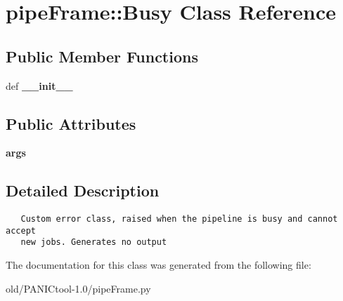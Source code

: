\section{pipe\-Frame::Busy Class Reference}
\label{classpipeFrame_1_1Busy}
\subsection*{Public Member Functions}
\begin{CompactItemize}
\item 
def \textbf{\_\-\_\-init\_\-\_\-}\label{classpipeFrame_1_1Busy_96ed97c58d604ae5b5b6ec37fe9e8447}

\end{CompactItemize}
\subsection*{Public Attributes}
\begin{CompactItemize}
\item 
\textbf{args}\label{classpipeFrame_1_1Busy_413fbba77a184e0e13cb50f8c96f8830}

\end{CompactItemize}


\subsection{Detailed Description}


\footnotesize\begin{verbatim}
   Custom error class, raised when the pipeline is busy and cannot accept
   new jobs. Generates no output
\end{verbatim}
\normalsize
 



The documentation for this class was generated from the following file:\begin{CompactItemize}
\item 
old/PANICtool-1.0/pipe\-Frame.py\end{CompactItemize}

